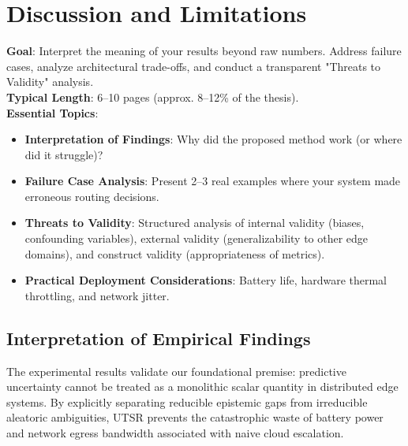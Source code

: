 
\chapter{Discussion and Limitations}
\label{ch:discussion}

\begin{takeawaybox}
\textbf{Goal}: Interpret the meaning of your results beyond raw numbers. Address failure cases, analyze architectural trade-offs, and conduct a transparent "Threats to Validity" analysis.\\
\textbf{Typical Length}: 6--10 pages (approx. 8--12\% of the thesis).\\
\textbf{Essential Topics}:
\begin{itemize}[leftmargin=*]
    \item \textbf{Interpretation of Findings}: Why did the proposed method work (or where did it struggle)?
    \item \textbf{Failure Case Analysis}: Present 2--3 real examples where your system made erroneous routing decisions.
    \item \textbf{Threats to Validity}: Structured analysis of internal validity (biases, confounding variables), external validity (generalizability to other edge domains), and construct validity (appropriateness of metrics).
    \item \textbf{Practical Deployment Considerations}: Battery life, hardware thermal throttling, and network jitter.
\end{itemize}
\end{takeawaybox}

\section{Interpretation of Empirical Findings}
\label{sec:disc_interpretation}

The experimental results validate our foundational premise: predictive uncertainty cannot be treated as a monolithic scalar quantity in distributed edge systems. By explicitly separating reducible epistemic gaps from irreducible aleatoric ambiguities, \ac{UTSR} prevents the catastrophic waste of battery power and network egress bandwidth associated with naive cloud escalation.

